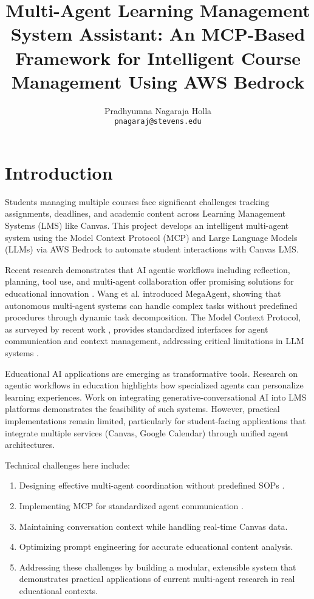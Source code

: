 \documentclass{article}
\title{Multi-Agent Learning Management System Assistant: An MCP-Based Framework for Intelligent Course Management Using AWS Bedrock}
\author{%
   Pradhyumna Nagaraja Holla \\
 \texttt{pnagaraj@stevens.edu} \\
}
\begin{document}
\maketitle

\section{Introduction}
Students managing multiple courses face significant challenges tracking assignments, deadlines, and academic content across Learning Management Systems (LMS) like Canvas. This project develops an intelligent multi-agent system using the Model Context Protocol (MCP) and Large Language Models (LLMs) via AWS Bedrock to automate student interactions with Canvas LMS.

Recent research demonstrates that AI agentic workflows including reflection, planning, tool use, and multi-agent collaboration offer promising solutions for educational innovation \cite{education2025agentic}. Wang et al. \cite{wang2025megaagent} introduced MegaAgent, showing that autonomous multi-agent systems can handle complex tasks without predefined procedures through dynamic task decomposition. The Model Context Protocol, as surveyed by recent work \cite{mcp2025landscape, mcp2025survey}, provides standardized interfaces for agent communication and context management, addressing critical limitations in LLM systems \cite{mcpenhance2025}.

Educational AI applications are emerging as transformative tools. Research on agentic workflows in education \cite{education2025agentic} highlights how specialized agents can personalize learning experiences. Work on integrating generative-conversational AI into LMS platforms \cite{lms2025ai} demonstrates the feasibility of such systems. However, practical implementations remain limited, particularly for student-facing applications that integrate multiple services (Canvas, Google Calendar) through unified agent architectures.

Technical challenges here include:

\begin{enumerate}
\item Designing effective multi-agent coordination without predefined SOPs \cite{wang2025megaagent}.
\item Implementing MCP for standardized agent communication \cite{mcp2025landscape, mcpagentic2025}.
\item Maintaining conversation context while handling real-time Canvas data.
\item Optimizing prompt engineering for accurate educational content analysis.
\item Addressing these challenges by building a modular, extensible system that demonstrates practical applications of current multi-agent research \cite{chen2024llmma, llmmas2025software} in real educational contexts.
\end{enumerate}
\end{document}
